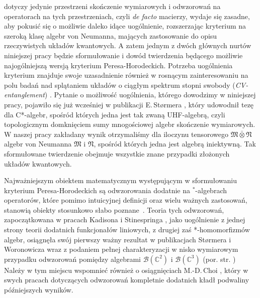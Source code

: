 dotyczy jedynie przestrzeni skończenie wymiarowych i odwzorowań na operatorach
na tych przestrzeniach,
czyli \emph{de facto} macierzy,
wydaje się zasadne,
aby pokusić się o możliwie daleko idące uogólnienie,
rozszerzając kryterium na szeroką klasę algebr von Neumanna,
mających zastosowanie do opisu rzeczywistych układów kwantowych.
A zatem jednym z dwóch głównych nurtów niniejszej pracy będzie sformułowanie
i dowód twierdzenia będącego możliwie najogólniejszą wersją
kryterium Peresa-Horodeckich.
Potrzeba uogólnienia kryterium znajduje swoje uzasadnienie również
w rosnącym zainteresowaniu na polu badań nad splątaniem układów o ciągłym
spektrum stopni swobody (\emph{CV-entanglement})
\cite{adesso2007entanglement}.
Pytanie o możliwość uogólnienia, którego dowodzimy w niniejszej pracy,
pojawiło się już wcześniej w publikacji E.\,St{\o}rmera
\cite{stormer2008separable},
który udowodnił tezę dla C*-algebr,
spośród których jedna jest tak zwaną UHF-algebrą,
czyli topologicznym domknięciem sumy mnogościowej algebr skończenie wymiarowych.
W naszej pracy zakładany wynik otrzymaliśmy dla iloczynu tensorowego
$\mathfrak{M} \bar{\otimes} \mathfrak{N}$
algebr von Neumanna $\mathfrak{M}$ i $\mathfrak{N}$,
spośród których jedna jest algebrą iniektywną.
Tak sformułowane twierdzenie obejmuje wszystkie znane
przypadki złożonych układów kwantowych.

Najważniejszym obiektem matematycznym występującym w sformułowaniu
kryterium Peresa-Horodeckich są odwzorowania dodatnie na $^{*}$-algebrach operatorów,
które pomimo intuicyjnej definicji oraz wielu ważnych zastosowań,
stanowią obiekty stosunkowo słabo
\mbox{poznane \cite{Stormer2013}}.
Teoria tych odwzorowań, zapoczątkowana w pracach
Kadisona \cite{kadison1952generalized}
i Stinespringa
\cite{stinespring1955positive},
jako uogólnienie z jednej strony teorii dodatnich funkcjonałów liniowych,
z drugiej zaś *-homomorfizmów algebr,
osiągnęła swój pierwszy ważny rezultat w publikacjach Størmera i Woronowicza
\cite{stormer1963positive,woronowicz1976positive}
wraz z podaniem pełnej charakteryzacji w nisko wymiarowym przypadku
odwzorowań pomiędzy algebrami $\mathcal{B}(\mathbb{C}^{2})$ i $\mathcal{B}(\mathbb{C}^{3})$
(por. str. \pageref{thm:PositiveMapsOnM2})
Należy w tym miejscu wspomnieć również o osiągnięciach M.-D.\,Choi
\cite{choi1975completely,choi1975positive,choi1980some,choi1977extremal},
który w swych pracach dotyczących odwzorowań kompletnie dodatnich
kładł podwaliny późniejszych wyników.

